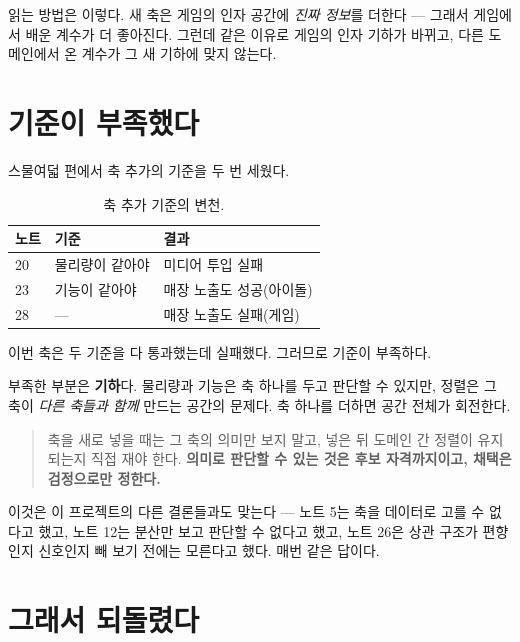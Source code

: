 \documentclass[10pt]{article}
\begin{document}
읽는 방법은 이렇다. 새 축은 게임의 인자 공간에 \emph{진짜 정보}를 더한다 ---
그래서 게임에서 배운 계수가 더 좋아진다. 그런데 같은 이유로 게임의 인자 기하가
바뀌고, 다른 도메인에서 온 계수가 그 새 기하에 맞지 않는다.


\section{기준이 부족했다}

스물여덟 편에서 축 추가의 기준을 두 번 세웠다.

\begin{table}[t]
\centering\tsize
\caption{축 추가 기준의 변천.}
\begin{tabular}{lll}
\toprule
노트 & 기준 & 결과 \\
\midrule
20 & 물리량이 같아야 & 미디어 투입 실패 \\
23 & 기능이 같아야 & 매장 노출도 성공(아이돌) \\
28 & --- & 매장 노출도 실패(게임) \\
\bottomrule
\end{tabular}
\end{table}

이번 축은 두 기준을 다 통과했는데 실패했다. 그러므로 기준이 부족하다.

부족한 부분은 \textbf{기하}다. 물리량과 기능은 축 하나를 두고 판단할 수 있지만,
정렬은 그 축이 \emph{다른 축들과 함께} 만드는 공간의 문제다. 축 하나를 더하면
공간 전체가 회전한다.

\begin{quote}\fontsize{9.5}{11.5}\selectfont
축을 새로 넣을 때는 그 축의 의미만 보지 말고, 넣은 뒤 도메인 간 정렬이 유지되는지
직접 재야 한다. \textbf{의미로 판단할 수 있는 것은 후보 자격까지이고, 채택은
검정으로만 정한다.}
\end{quote}

이것은 이 프로젝트의 다른 결론들과도 맞는다 --- 노트 5는 축을 데이터로 고를 수
없다고 했고, 노트 12는 분산만 보고 판단할 수 없다고 했고, 노트 26은 상관 구조가
편향인지 신호인지 빼 보기 전에는 모른다고 했다. 매번 같은 답이다.

\section{그래서 되돌렸다}
\end{document}
